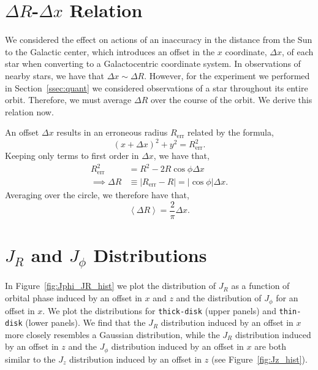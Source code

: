 \documentclass[twocolumn]{aastex62}
\newcommand{\abs}[1]{\left| #1 \right|}
\newcommand{\avg}[1]{\left< #1 \right>}
\newcommand{\beq}{\begin{equation}}
\newcommand{\eeq}{\end{equation}}
\newcommand{\thin}{\texttt{thin-disk}}
\newcommand{\thick}{\texttt{thick-disk}}
\begin{document}
\section{$\Delta R$-$\Delta x$ Relation} \label{app:deltax}
We considered the effect on actions of an inaccuracy in the distance from the
Sun to the Galactic center, which introduces an offset in the $x$ coordinate,
$\Delta x$, of each star when converting to a Galactocentric coordinate
system. In observations of nearby stars, we have that $\Delta x \sim \Delta
R$. However, for the experiment we performed in Section~\ref{ssec:quant} we
considered observations of a star throughout its entire orbit. Therefore, we
must average $\Delta R$ over the course of the orbit. We derive this relation
now.

An offset $\Delta x$ results in an erroneous radius $R_{\text{err}}$ related by
the formula,
\beq
(x+\Delta x)^2 + y^2 = R_{\text{err}}^2\text{.}
\eeq
Keeping only terms to first order in $\Delta x$, we have that,
\beq
\begin{split}
R_{\text{err}}^2 &= R^2 - 2 R \cos{\phi} \Delta x \\
\implies \Delta R &\equiv \abs{R_{\text{err}} - R}
        = \abs{\cos{\phi}} \Delta x\text{.}
\end{split}
\eeq
Averaging over the circle, we therefore have that,
\beq
\avg{\Delta R} = \frac{2}{\pi} \Delta x\text{.}
\eeq

\section{$J_R$ and $J_{\phi}$ Distributions} \label{app:hist}

In Figure~\ref{fig:Jphi_JR_hist} we plot the distribution of $J_R$ as a
function of orbital phase induced by an offset in $x$ and $z$ and the
distribution of $J_{\phi}$ for an offset in $x$. We plot the distributions for
\thick{} (upper panels) and \thin{} (lower panels). We find that the $J_R$
distribution induced by an offset in $x$ more closely resembles a Gaussian
distribution, while the $J_R$ distribution induced by an offset in $z$ and the
$J_{\phi}$ distribution induced by an offset in $x$ are both similar to the
$J_z$ distribution induced by an offset in $z$ (see Figure~\ref{fig:Jz_hist}).
\end{document}
